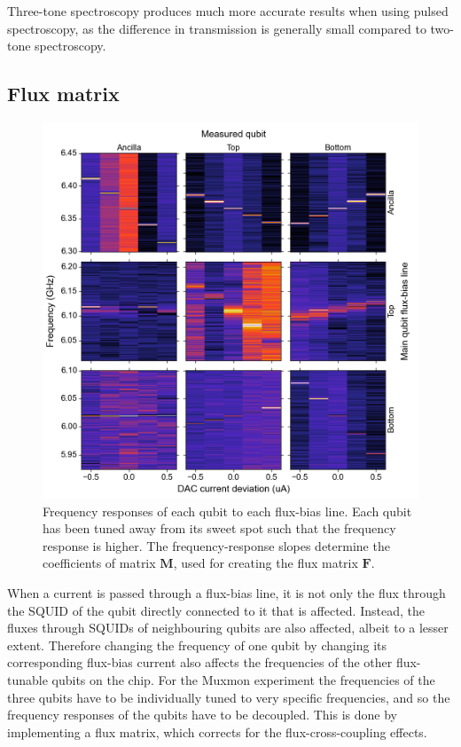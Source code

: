         Three-tone spectroscopy produces much more accurate results when using pulsed spectroscopy, as the difference in transmission is generally small compared to two-tone spectroscopy.

      \subsection{Flux matrix}
        \label{ssec:Flux matrix}

        \begin{figure}[tb]
          \centering
          \includegraphics[width=\textwidth]{Figures/Qubit characterization/Flux_matrix.png}
          \caption{Frequency responses of each qubit to each flux-bias line. Each qubit has been tuned away from its sweet spot such that the frequency response is higher. The frequency-response slopes determine the coefficients of matrix $\boldsymbol{M}$, used for creating the flux matrix $\boldsymbol{F}$.}
          \label{fig:flux matrix}
        \end{figure}
        When a current is passed through a flux-bias line, it is not only the flux through the SQUID of the qubit directly connected to it that is affected. Instead, the fluxes through SQUIDs of neighbouring qubits are also affected, albeit to a lesser extent. Therefore changing the frequency of one qubit by changing its corresponding flux-bias current also affects the frequencies of the other flux-tunable qubits on the chip. For the Muxmon experiment the frequencies of the three qubits have to be individually tuned to very specific frequencies, and so the frequency responses of the qubits have to be decoupled. This is done by implementing a flux matrix, which corrects for the flux-cross-coupling effects.

